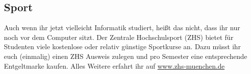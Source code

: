 \subsection{Sport}
Auch wenn ihr jetzt vielleicht Informatik studiert, heißt das nicht, dass 
ihr nur noch vor dem Computer sitzt. \doublebreak
Der Zentrale Hochschulsport (ZHS) bietet für Studenten 
viele kostenlose oder relativ günstige Sportkurse an. 
Dazu müsst ihr euch (einmalig) einen ZHS Ausweis 
zulegen und pro Semester eine entsprechende 
Entgeltmarke kaufen. \doublebreak
Alles Weitere erfahrt ihr auf \linebreak
\url{www.zhs-muenchen.de}